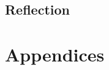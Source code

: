\documentclass[12pt]{report}
\begin{document}
\chapter{Reflection}

	

\part{Appendices}

	\appendix
	

	
	
	

	
	

	
	

	
	

	
	

	
	

	
	
\end{document}
